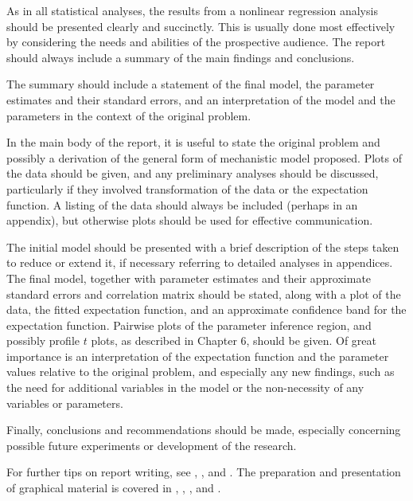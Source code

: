 As in all statistical analyses,
the results from a nonlinear regression analysis should be
presented clearly and succinctly.
This is usually done most effectively by considering the needs
and abilities of the prospective audience.
The report should always include a summary of the main findings
and conclusions.

The summary should include a
statement of the final model, the parameter estimates and their
standard errors, and an interpretation of the model and the
parameters in the context of the original problem.

In the main body of the report, it is useful to state the
original problem and possibly a derivation of the general form of
mechanistic model proposed.
Plots of the data should be given, and any preliminary analyses
should be discussed, particularly if they involved transformation
of the data or the expectation function.
A listing of the data should always be included (perhaps in an
appendix), but otherwise plots should be used for effective
communication.

The initial model should be presented with a brief
description of the steps taken to reduce or extend it, if
necessary referring to detailed analyses in appendices.
The final model, together with parameter estimates and their
approximate standard errors and correlation matrix should be
stated, along with a plot of the data, the fitted expectation
function, and an approximate confidence band for the
expectation function.
Pairwise plots of the parameter inference region,
and possibly profile $t$ plots,
as described in Chapter 6, should be given.
Of great importance is an interpretation of the expectation
function and the parameter values relative to the original
problem, and especially any new findings, such as the need for
additional variables in the model or the non-necessity of any
variables or parameters.

Finally, conclusions and recommendations should be made,
especially concerning possible future experiments or development
of the research.

For further tips on report writing, see ,
, and .
The preparation and presentation of graphical material is covered in
, ,
, and .

